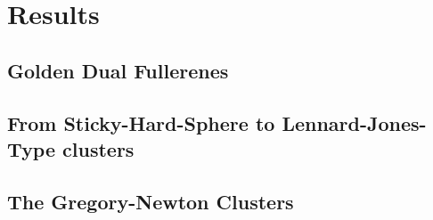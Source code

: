 
\part{Results}
\label{sec:results}

\chapter{Golden Dual Fullerenes}
\label{sec:goldendualfullerenes}

\chapter{From Sticky-Hard-Sphere to Lennard-Jones-Type clusters}
\label{sec:fromstickyhardspheretoLJtypeclusters}

\chapter{The Gregory-Newton Clusters}
\label{sec:thegregorynewtonclusters}

